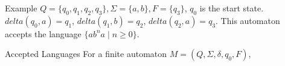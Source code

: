 \documentclass{beamer}
\begin{document}
\begin{frame}{Example}
$Q=\{q_0,q_1,q_2,q_3\},\Sigma=\{a,b\},F=\{q_3\}$, $q_0$ is the start state. $delta(q_0,a)=q_1$, $delta(q_1,b)=q_2$, $delta(q_2,a)=q_3$. This automaton accepts the language $\{ab^na\mid n\geq 0\}$.
\end{frame}

\begin{frame}{Accepted Languages}
For a finite automaton $M=(Q,\Sigma,\delta,q_0,F)$,
\end{frame}

\end{document}
